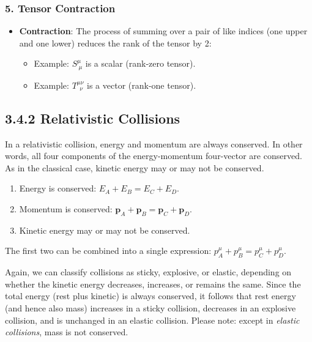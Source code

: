 \documentclass[12pt]{book}
\begin{document}
            \subsubsection*{5. Tensor Contraction}
            
                \begin{itemize}
                    \item \textbf{Contraction}: The process of summing over a pair of like indices (one upper and one lower) reduces the rank of the tensor by 2:
                    \begin{itemize}
                        \item Example: \( S^\mu_{\ \mu} \) is a scalar (rank-zero tensor).
                        \item Example: \( T^{\mu \nu}_{\ \ \nu} \) is a vector (rank-one tensor).
                    \end{itemize}
                \end{itemize}

        \subsection{3.4.2 Relativistic Collisions}
            In a relativistic collision, energy and momentum are always conserved. In other words, all four components of the energy-momentum four-vector are conserved. As in the classical case, kinetic energy may or may not be conserved.
            
            \begin{enumerate}
                \item Energy is conserved: \( E_A + E_B = E_C + E_D \).
                \item Momentum is conserved: \( \mathbf{p}_A + \mathbf{p}_B = \mathbf{p}_C + \mathbf{p}_D \).
                \item Kinetic energy may or may not be conserved.
            \end{enumerate}
            
            The first two can be combined into a single expression: \( p_A^\mu + p_B^\mu = p_C^\mu + p_D^\mu \).
            
            Again, we can classify collisions as sticky, explosive, or elastic, depending on whether the kinetic energy decreases, increases, or remains the same. Since the total energy (rest plus kinetic) is always conserved, it follows that rest energy (and hence also mass) increases in a sticky collision, decreases in an explosive collision, and is unchanged in an elastic collision. Please note: except in \textit{elastic collisions}, mass is not conserved.
            
\end{document}
